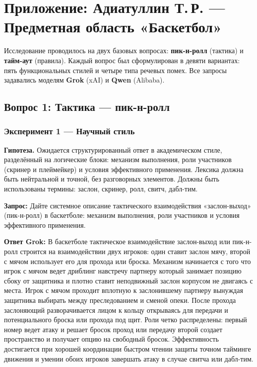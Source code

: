 \documentclass[a4paper, final]{article}
\begin{document}
\tableofcontents
\newpage

\section{Приложение: Адиатуллин Т.\,Р. — Предметная область «Баскетбол»}

Исследование проводилось на двух базовых вопросах: \textbf{пик-н-ролл} (тактика) и \textbf{тайм-аут} (правила). Каждый вопрос был сформулирован в девяти вариантах: пять функциональных стилей и четыре типа речевых помех. Все запросы задавались моделям \textbf{Grok} (xAI) и \textbf{Qwen} (Alibaba).

\newpage

\subsection{Вопрос 1: Тактика — пик-н-ролл}

\subsubsection{Эксперимент 1 — Научный стиль}

\noindent\textbf{Гипотеза.} Ожидается структурированный ответ в академическом стиле, разделённый на логические блоки: механизм выполнения, роли участников (скринер и плеймейкер) и условия эффективного применения. Лексика должна быть нейтральной и точной, без разговорных элементов. Должны быть использованы термины: заслон, скринер, ролл, свитч, дабл-тим.

\noindent\textbf{Запрос:} Дайте системное описание тактического взаимодействия «заслон-выход» (пик-н-ролл) в баскетболе: механизм выполнения, роли участников и условия эффективного применения.

\noindent\textbf{Ответ Grok:} В баскетболе тактическое взаимодействие заслон-выход или пик-н-ролл строится на взаимодействии двух игроков: один ставит заслон мячу, второй с мячом использует его для прохода или броска. Механизм начинается с того что игрок с мячом ведет дриблинг навстречу партнеру который занимает позицию сбоку от защитника и плотно ставит неподвижный заслон корпусом не двигаясь с места. Игрок с мячом проходит вплотную к заслонившему партнеру вынуждая защитника выбирать между преследованием и сменой опеки. После прохода заслоняющий разворачивается лицом к кольцу открываясь для передачи и потенциального броска или прохода под щит. Роли четко распределены: первый номер ведет атаку и решает бросок проход или передачу второй создает пространство и получает опцию на свободный бросок. Эффективность достигается при хорошей координации быстром чтении защиты точном тайминге движения и умении обоих игроков завершать атаку в случае свитча или дабл-тим.
\end{document}
